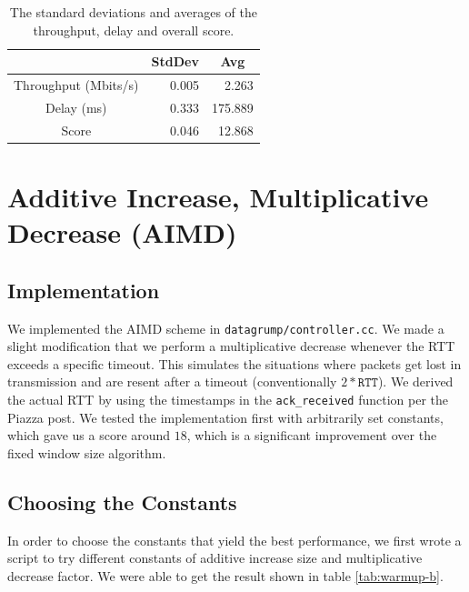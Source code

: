 \documentclass[11pt,a4paper]{article}
\begin{document}
\begin{table}[h]
  \centering
  \begin{tabular}{|c|r|r|}
    \hline
                         & \multicolumn{1}{c|}{StdDev} &
    \multicolumn{1}{c|}{Avg} \\ \hline
    Throughput (Mbits/s) & 0.005                       & 2.263
    \\ \hline
    Delay (ms)           & 0.333                       & 175.889
    \\ \hline
    Score                & 0.046                       & 12.868
    \\ \hline
  \end{tabular}
  \caption{The standard deviations and averages of the throughput, delay and
  overall score.}
  \label{tab:warmup-a}
\end{table}


\section{Additive Increase, Multiplicative Decrease (AIMD)}
\label{sec:aimd}

\subsection{Implementation}

We implemented the AIMD scheme in \verb|datagrump/controller.cc|. We made a slight modification that we perform
a multiplicative decrease whenever the RTT exceeds a specific timeout. This
simulates the situations where packets get lost in transmission and are resent
after a timeout (conventionally $2* \texttt{RTT}$). We derived the actual RTT by using
the timestamps in the \texttt{ack\_received} function per the Piazza post. We
tested the implementation first with arbitrarily set constants, which gave us a score
around $18$, which is a significant improvement over the fixed window size
algorithm.

\subsection{Choosing the Constants}

In order to choose the constants that yield the best performance, we first wrote a
script to try different constants of additive increase
size and multiplicative decrease factor. We were able to get the result shown
in table \ref{tab:warmup-b}.
\end{document}
